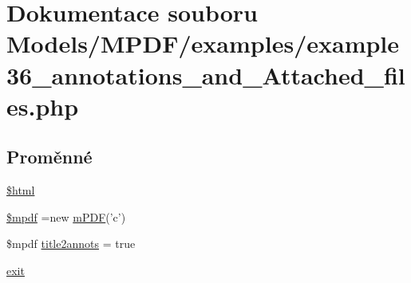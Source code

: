 \hypertarget{example36__annotations__and___attached__files_8php}{\section{Dokumentace souboru Models/\-M\-P\-D\-F/examples/example36\-\_\-annotations\-\_\-and\-\_\-\-Attached\-\_\-files.php}
\label{example36__annotations__and___attached__files_8php}
}
\subsection*{Proměnné}
\begin{DoxyCompactItemize}
\item 
\hyperlink{example36__annotations__and___attached__files_8php_a6f96e7fc92441776c9d1cd3386663b40}{\$html}
\item 
\hyperlink{example36__annotations__and___attached__files_8php_ad028f81910d6cbab9b184d2214b3a8f8}{\$mpdf} =new \hyperlink{classm_p_d_f}{m\-P\-D\-F}('c')
\item 
\$mpdf \hyperlink{example36__annotations__and___attached__files_8php_a6858b83300e964b6c235331d75451e50}{title2annots} = true
\item 
\hyperlink{example36__annotations__and___attached__files_8php_a6733eb5f605d09eaede9845835d71c4e}{exit}
\end{DoxyCompactItemize}


